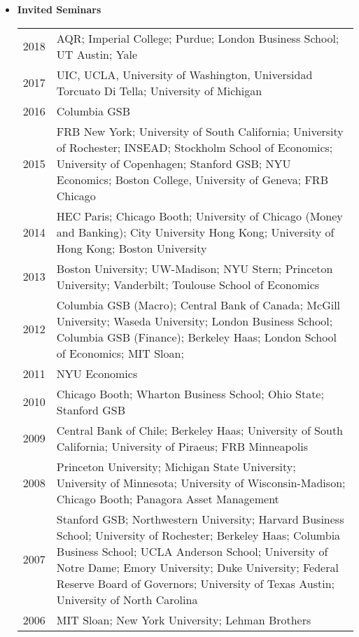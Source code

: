 \documentclass[12pt,letterpaper,serif,overlapped]{res}
\begin{document}
\begin{resume}
\begin{itemize}
\item \textbf{Invited Seminars}
\begin{longtable}{lp{15cm}}
2018 & AQR;  Imperial College; Purdue; London Business School; UT Austin; Yale\\[0.1cm]
2017 & UIC, UCLA, University of Washington, Universidad Torcuato Di Tella; University of Michigan \\[0.1cm]
2016 & Columbia GSB\\[0.1cm]
2015 & FRB New York; University of South California; University of Rochester; INSEAD; Stockholm School of Economics; University of Copenhagen; Stanford GSB; NYU Economics; Boston College, University of Geneva; FRB Chicago\\[0.1cm]
2014 &HEC Paris; Chicago Booth; University of Chicago (Money and Banking); City University Hong Kong; University of Hong Kong; Boston University\\[0.1cm]
2013 & Boston University; UW-Madison; NYU Stern; Princeton University; Vanderbilt; Toulouse School of Economics \\[0.1cm]
2012 & Columbia GSB (Macro); Central Bank of Canada; McGill University; Waseda University; London Business School; Columbia GSB (Finance); Berkeley Haas;  London School of Economics; MIT Sloan;\\[0.1cm]
2011 & NYU Economics\\[0.1cm]
2010 & Chicago Booth; Wharton Business School; Ohio State; Stanford GSB\\[0.1cm]
2009 & Central Bank of Chile; Berkeley Haas; University of South California;   University of Piraeus; FRB Minneapolis\\[0.1cm]
2008 & Princeton University; Michigan State University; University of Minnesota;    University of Wisconsin-Madison; Chicago Booth; Panagora Asset Management\\[0.1cm]
2007 & Stanford GSB; Northwestern University; Harvard Business School;   University of Rochester; Berkeley Haas; Columbia Business School;  UCLA Anderson School; University of Notre Dame;    Emory University; Duke University; Federal Reserve Board of Governors;  University of Texas Austin; University of North Carolina\\[0.1cm]
2006 & MIT Sloan; New York University; Lehman Brothers\\
\end{longtable}



\end{itemize}
\end{resume}
\end{document}
